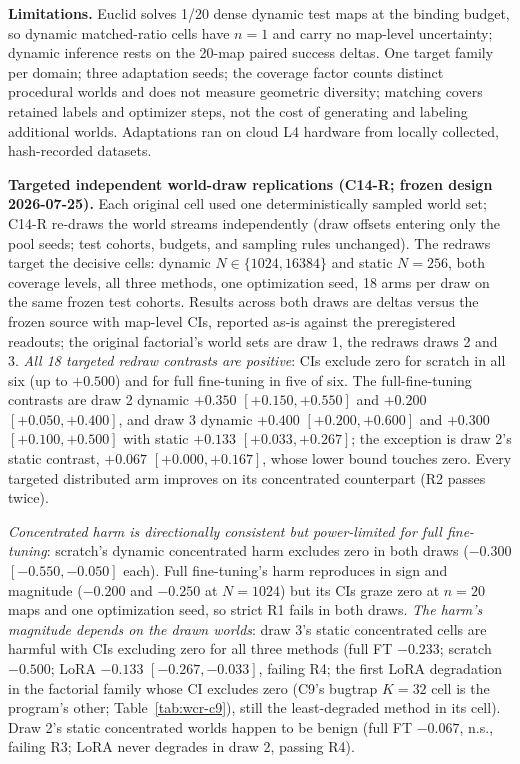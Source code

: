 \documentclass[letterpaper]{article} %
\newcommand{\stage}[1]{\textsc{#1}}
\begin{document}
\textbf{Limitations.} Euclid solves 1/20 dense dynamic test maps at the binding budget, so dynamic matched-ratio cells have $n{=}1$ and carry no map-level uncertainty; dynamic inference rests on the 20-map paired success deltas. One target family per domain; three adaptation seeds; the coverage factor counts distinct procedural worlds and does not measure geometric diversity; matching covers retained labels and optimizer steps, not the cost of generating and labeling additional worlds. Adaptations ran on cloud L4 hardware from locally collected, hash-recorded datasets.

\textbf{Targeted independent world-draw replications (C14-R; frozen design 2026-07-25).} Each original cell used one deterministically sampled world set; C14-R re-draws the world streams independently (draw offsets entering only the pool seeds; test cohorts, budgets, and sampling rules unchanged). The redraws target the decisive cells: dynamic $N \in \{1024, 16384\}$ and static $N{=}256$, both coverage levels, all three methods, one optimization seed, 18 arms per draw on the same frozen test cohorts. Results across both draws are deltas versus the frozen source with map-level CIs, reported as-is against the preregistered readouts; the original factorial's world sets are draw 1, the redraws draws 2 and 3. \emph{All 18 targeted redraw contrasts are positive}: CIs exclude zero for scratch in all six (up to $+0.500$) and for full fine-tuning in five of six. The full-fine-tuning contrasts are draw 2 dynamic $+0.350$ $[+0.150,+0.550]$ and $+0.200$ $[+0.050,+0.400]$, and draw 3 dynamic $+0.400$ $[+0.200,+0.600]$ and $+0.300$ $[+0.100,+0.500]$ with static $+0.133$ $[+0.033,+0.267]$; the exception is draw 2's static contrast, $+0.067$ $[+0.000,+0.167]$, whose lower bound touches zero. Every targeted distributed arm improves on its concentrated counterpart (R2 passes twice).

\emph{Concentrated harm is directionally consistent but power-limited for full fine-tuning}: scratch's dynamic concentrated harm excludes zero in both draws ($-0.300$ $[-0.550,-0.050]$ each). Full fine-tuning's harm reproduces in sign and magnitude ($-0.200$ and $-0.250$ at $N{=}1024$) but its CIs graze zero at $n{=}20$ maps and one optimization seed, so strict R1 fails in both draws. \emph{The harm's magnitude depends on the drawn worlds}: draw 3's static concentrated cells are harmful with CIs excluding zero for all three methods (full FT $-0.233$; scratch $-0.500$; LoRA $-0.133$ $[-0.267,-0.033]$, failing R4; the first LoRA degradation in the factorial family whose CI excludes zero (\stage{C9}'s bugtrap $K{=}32$ cell is the program's other; Table~\ref{tab:wcr-c9}), still the least-degraded method in its cell). Draw 2's static concentrated worlds happen to be benign (full FT $-0.067$, n.s., failing R3; LoRA never degrades in draw 2, passing R4).
\end{document}
